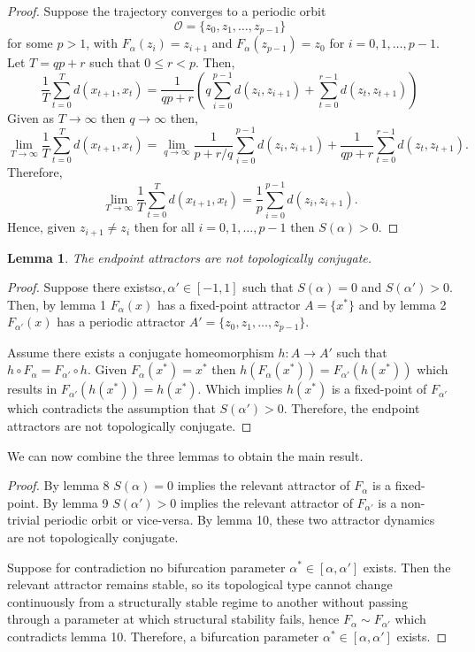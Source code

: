 \documentclass[11pt]{article}
\theoremstyle{plain}
\newtheorem{lemma}[theorem]{Lemma}
\theoremstyle{definition}
\theoremstyle{remark}
\begin{document}
\begin{proof}
Suppose the trajectory converges to a periodic orbit 
\[
\mathcal O = \{z_0, z_1, \ldots, z_{p-1}\}
\] for some \(p > 1\),
with \(F_{\alpha}(z_i) = z_{i+1}\) and \(F_{\alpha}(z_{p-1}) = z_0\) for
\(i = 0, 1, \ldots, p-1\).
Let \(T = qp + r\) such that \(0 \leq r < p\). Then,
\[
\frac{1}{T}\sum_{t=0}^{T} d(x_{t+1}, x_t) = \frac{1}{qp + r} 
(q\sum_{i=0}^{p-1} d(z_i, z_{i+1}) + \sum_{t=0}^{r-1} d(z_t, z_{t+1}))
\]
Given as \(T \to \infty\) then \(q \to \infty\) then,
\[
\lim_{T \to \infty} \frac{1}{T} \sum_{t=0}^{T} d(x_{t+1}, x_t) = 
\lim_{q \to \infty} \frac{1}{p + r/q} 
\sum_{i=0}^{p-1} d(z_i, z_{i+1}) + \frac{1}{qp + r}\sum_{t=0}^{r-1} d(z_t, z_{t+1}).
\]
Therefore,
\[
\lim_{T \to \infty} \frac{1}{T} \sum_{t=0}^{T} d(x_{t+1}, x_t) = 
\frac{1}{p}\sum_{i=0}^{p-1} d(z_i, z_{i+1}).
\]
Hence, given \(z_{i+1} \neq z_i\) then for all \(i = 0, 1, \ldots, p-1\) then \(S(\alpha) > 0\).

\end{proof}


\begin{lemma}
The endpoint attractors are not topologically conjugate.
\end{lemma}

\begin{proof}

Suppose there exists\(\alpha, \alpha' \in [-1, 1]\) such that
\(S(\alpha) = 0\) and \(S(\alpha') > 0\). Then, by lemma 1 
\(F_\alpha(x)\) has a fixed-point attractor \(A = \{x^*\}\) and by lemma 2
\(F_{\alpha'}(x)\) has a periodic attractor \(A' = \{z_0, z_1, \ldots, z_{p-1}\}\).

Assume there exists a conjugate homeomorphism 
\(h: A \to A'\) such that
\(h \circ F_\alpha = F_{\alpha'} \circ h\). Given \(F_\alpha(x^*) = x^*\) 
then \(h(F_\alpha(x^*)) = F_{\alpha'}(h(x^*))\) which results in
\(F_{\alpha'}(h(x^*)) = h(x^*)\).
Which implies \(h(x^*)\) is a fixed-point of \(F_{\alpha'}\) which contradicts the assumption that \(S(\alpha') > 0\).
Therefore, the endpoint attractors are not topologically conjugate.
\end{proof}

We can now combine the three lemmas to obtain the main result.

\begin{proof}
By lemma 8 \(S(\alpha) = 0\) implies the relevant attractor of \(F_\alpha\) 
is a fixed-point. By lemma 9 \(S(\alpha') > 0\) implies the relevant attractor of 
\(F_{\alpha'}\) is a non-trivial periodic orbit or vice-versa. 
By lemma 10, these two attractor dynamics are not topologically conjugate.

Suppose for contradiction no bifurcation parameter \(\alpha^* \in [\alpha, \alpha']\)
exists. Then the relevant attractor remains stable, so its topological type cannot
change continuously from a structurally stable regime to another without passing
through a parameter at which structural stability fails, hence
\(F_\alpha \sim F_{\alpha'}\) which contradicts lemma 10. 
Therefore, a bifurcation parameter \(\alpha^* \in [\alpha, \alpha']\) exists.
\end{proof}

\clearpage 


\end{document}
